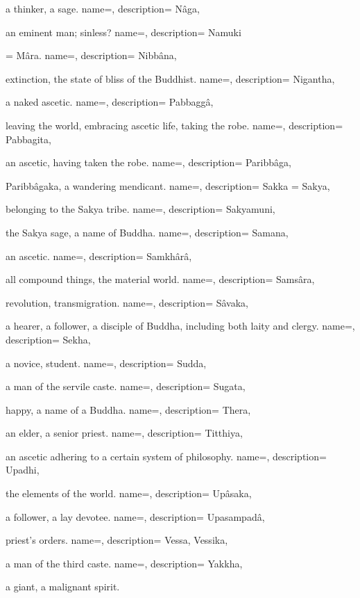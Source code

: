 a thinker, a sage.
\newglossaryentry{}
{
  name=,
 description=
}
Nâga,
	

an eminent man; sinless?
\newglossaryentry{}
{
  name=,
 description=
}
Namuki
	

= Mâra.
\newglossaryentry{}
{
  name=,
 description=
}
Nibbâna,
	

extinction, the state of bliss of the Buddhist.
\newglossaryentry{}
{
  name=,
 description=
}
Nigantha,
	

a naked ascetic.
\newglossaryentry{}
{
  name=,
 description=
}
Pabbaggâ,
	

leaving the world, embracing ascetic life, taking the robe.
\newglossaryentry{}
{
  name=,
 description=
}
Pabbagita,
	

an ascetic, having taken the robe.
\newglossaryentry{}
{
  name=,
 description=
}
Paribbâga,
	

Paribbâgaka, a wandering mendicant.
\newglossaryentry{}
{
  name=,
 description=
}
Sakka = Sakya,
	

belonging to the Sakya tribe.
\newglossaryentry{}
{
  name=,
 description=
}
Sakyamuni,
	

the Sakya sage, a name of Buddha.
\newglossaryentry{}
{
  name=,
 description=
}
Samana,
	

an ascetic.
\newglossaryentry{}
{
  name=,
 description=
}
Samkhârâ,
	

all compound things, the material world.
\newglossaryentry{}
{
  name=,
 description=
}
Samsâra,
	

revolution, transmigration.
\newglossaryentry{}
{
  name=,
 description=
}
Sâvaka,
	

a hearer, a follower, a disciple of Buddha, including both laity and clergy.
\newglossaryentry{}
{
  name=,
 description=
}
Sekha,
	

a novice, student.
\newglossaryentry{}
{
  name=,
 description=
}
Sudda,
	

a man of the servile caste.
\newglossaryentry{}
{
  name=,
 description=
}
Sugata,
	

happy, a name of a Buddha.
\newglossaryentry{}
{
  name=,
 description=
}
Thera,
	

an elder, a senior priest.
\newglossaryentry{}
{
  name=,
 description=
}
Titthiya,
	

an ascetic adhering to a certain system of philosophy.
\newglossaryentry{}
{
  name=,
 description=
}
Upadhi,
	

the elements of the world.
\newglossaryentry{}
{
  name=,
 description=
}
Upâsaka,
	

a follower, a lay devotee.
\newglossaryentry{}
{
  name=,
 description=
}
Upasampadâ,
	

priest's orders.
\newglossaryentry{}
{
  name=,
 description=
}
Vessa, Vessika,
	

a man of the third caste.
\newglossaryentry{}
{
  name=,
 description=
}
Yakkha,
	

a giant, a malignant spirit.